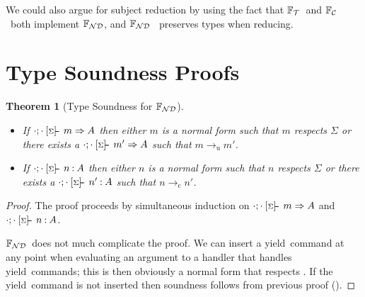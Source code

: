 \documentclass[msc,deptreport,cs]{infthesis} %
\newtheorem{theorem}{Theorem}
\newcommand\nondetfrank{$\mathbb{F}_{\cal{ND}}$}
\newcommand\countingfrank{$\mathbb{F}_{\cal{C}}$}
\newcommand\treefrank{$\mathbb{F}_{\cal{T}}$}
\newcommand\yield{\textsf{yield}\xspace}
\newcommand{\sigentails}[1]{\mathbin{[{\text{\scriptsize ${#1}$}}]\hspace{-0.4ex}\text{-\!-}}\,}
\newcommand{\inferbase}[5]{#1; #3 \mathbin{#2} {#4} \Rightarrow {#5}}
\newcommand{\checkbase}[5]{#1; #3 \mathbin{#2} #5 \mathbin{:} #4}
\newcommand{\makes}[5]{\inferbase{#1}{\sigentails{#3}}{#2}{#4}{#5}}
\newcommand{\has}[5]{\checkbase{#1}{\sigentails{#3}}{#2}{#4}{#5}}
\newcommand{\infers}{\makes}
\newcommand{\checks}{\has}
\newcommand{\sigs}{\Sigma}
\newcommand{\stepstou}{\longrightarrow_{\mathrm{u}}}
\newcommand{\stepstoc}{\longrightarrow_{\mathrm{c}}}
\begin{document}
We could also argue for subject reduction by using the fact that \treefrank~and
\countingfrank~both implement \nondetfrank, and \nondetfrank~ preserves types
when reducing.

\section{Type Soundness Proofs}
\label{sec:type-soundness-proofs}

\begin{theorem}[Type Soundness for \nondetfrank]~
\begin{itemize}
\\
\item If $\infers{\cdot}{\cdot}{\sigs}{m}{A}$ then either $m$ is a normal form
  such that $m$ respects $\sigs$ or there exists a
  $\infers{\cdot}{\cdot}{\sigs}{m'}{A}$ such that $m \stepstou m'$.
\item If $\checks{\cdot}{\cdot}{\sigs}{A}{n}$ then either $n$ is a normal form
  such that $n$ respects $\sigs$ or there exists a
  $\checks{\cdot}{\cdot}{\sigs}{A}{n'}$ such that $n \stepstoc n'$.
\end{itemize}
\end{theorem}
\begin{proof}
The proof proceeds by simultaneous induction on
$\infers{\cdot}{\cdot}{\sigs}{m}{A}$ and $\checks{\cdot}{\cdot}{\sigs}{A}{n}$.

\nondetfrank~does not much complicate the proof. We can insert a \yield~command
at any point when evaluating an argument to a handler that handles
\yield~commands; this is then obviously a normal form that respects \sigs. If
the \yield~command is not inserted then soundness follows from previous proof
(\cite{convent2020doo}).
\end{proof}
\end{document}
